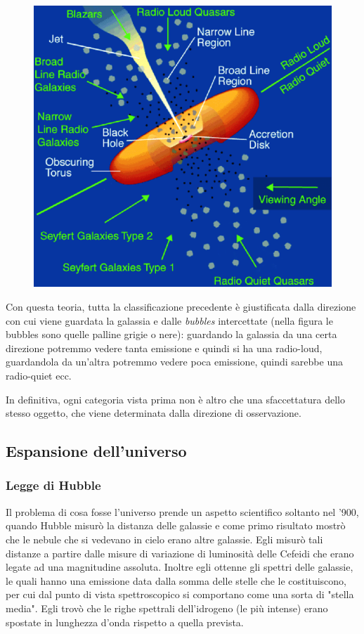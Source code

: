 \begin{figure}[H]
    \centering
    \includegraphics[width=12cm]{immagini_lezioni12-12/51.png}
\end{figure}

Con questa teoria, tutta la classificazione precedente è giustificata dalla direzione con cui viene guardata la galassia e dalle \textit{bubbles} intercettate (nella figura le bubbles sono quelle palline grigie o nere): guardando la galassia da una certa direzione potremmo vedere tanta emissione e quindi si ha una radio-loud, guardandola da un'altra potremmo vedere poca emissione, quindi sarebbe una radio-quiet ecc.

In definitiva, ogni categoria vista prima non è altro che una sfaccettatura dello stesso oggetto, che viene determinata dalla direzione di osservazione.

\subsection{Espansione dell'universo}

\subsubsection{Legge di Hubble}

Il problema di cosa fosse l'universo prende un aspetto scientifico soltanto nel '900, quando Hubble misurò la distanza delle galassie e come primo risultato mostrò che le nebule che si vedevano in cielo erano altre galassie. Egli misurò tali distanze a partire dalle misure di variazione di luminosità delle Cefeidi che erano legate ad una magnitudine assoluta. Inoltre egli ottenne gli spettri delle galassie, le quali hanno una emissione data dalla somma delle stelle che le costituiscono, per cui dal punto di vista spettroscopico si comportano come una sorta di "stella media". Egli trovò che le righe spettrali dell'idrogeno (le più intense) erano spostate in lunghezza d'onda rispetto a quella prevista.

